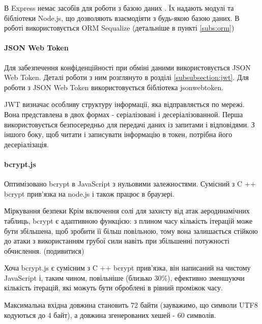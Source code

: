 В Express немає засобів для роботи з базою даних \cite{simon2015nodeexpress}. Їх надають модулі та бібліотеки Node.js, що дозволяють взаємодіяти з будь-якою базою даних. В роботі використовується ORM Sequalize (детальніше в пункті \ref{subs:orm})


\paragraph{JSON Web Token}

Для забезпечення конфіденційності при обміні даними використовується JSON Web Token. Деталі роботи з ним розглянуто в розділі \ref{subsubsection:jwt}. Для роботи з JSON Web Token використовується бібліотека jsonwebtoken.

JWT визначає особливу структуру інформації, яка відправляється по мережі. Вона представлена в двох формах - серіалізовані і десеріалізованной. Перша використовується безпосередньо для передачі даних із запитами і відповідями. З іншого боку, щоб читати і записувати інформацію в токен, потрібна його десеріалізація.



\paragraph{bcrypt.js}

Оптимізовано bcrypt в JavaScript з нульовими залежностями. Сумісний з C ++ bcrypt прив'язка на node.js і також працює в браузері.

Міркування безпеки
Крім включення солі для захисту від атак аеродинамічних таблиць, bcrypt є адаптивною функцією: з плином часу кількість ітерацій може бути збільшена, щоб зробити її більш повільною, тому вона залишається стійкою до атаки з використанням грубої сили навіть при збільшенні потужності обчислення. (подивитися)

Хоча bcrypt.js є сумісним з C ++ bcrypt прив'язка, він написаний на чистому JavaScript і, таким чином, повільніше (близько 30\%), ефективно зменшуючи кількість ітерацій, які можуть бути оброблені в рівний проміжок часу.

Максимальна вхідна довжина становить 72 байти (зауважимо, що символи UTF8 кодуються до 4 байт), а довжина згенерованих хешей - 60 символів.
